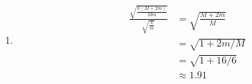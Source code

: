 \documentclass{article}
\begin{document}
\begin{enumerate}
  \item

        \begin{align*}
          \frac{\sqrt{\frac{k (M + 2 m)}{M m}}}{\sqrt{\frac{k}{m}}} & = \sqrt{\frac{M + 2 m}{M}} \\
                                                                    & = \sqrt{1 + 2 m / M}       \\
                                                                    & = \sqrt{1 + 16 / 6}        \\
                                                                    & \approx 1.91
        \end{align*}
\end{enumerate}

\subsection{}
\end{document}
